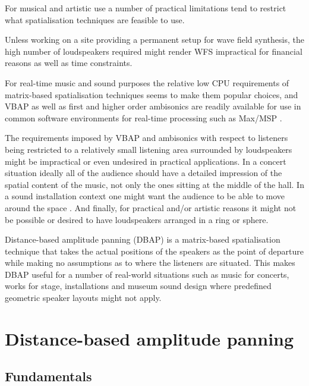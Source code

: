 \documentclass[twoside,10pt]{article}
\begin{document}
For musical and artistic use a number of practical limitations tend to restrict what spatialisation techniques are feasible to use.

Unless working on a site providing a permanent setup for wave field synthesis, the high number of loudspeakers required might render WFS impractical for financial reasons as well as time constraints.

For real-time music and sound purposes the relative low CPU requirements of matrix-based spatialisation techniques seems to make them popular choices, and VBAP as well as first and higher order ambisonics are readily available for use in common software environments for real-time processing such as Max/MSP \cite{Pulkki:2000vbap_max, Schacher:2006ambi_max, Neukom:2008ambipan}.

The requirements imposed by VBAP and ambisonics with respect to listeners being restricted to a relatively small listening area surrounded by loudspeakers might be impractical or even undesired in practical applications. In a concert situation ideally all of the audience should have a detailed impression of the spatial content of the music, not only the ones sitting at the middle of the hall. In a sound installation context one might want the audience to be able to move around the space \cite{lossius:2008installations}. And finally, for practical and/or artistic reasons it might not be possible or desired to have loudspeakers arranged in a ring or sphere.

Distance-based amplitude panning (DBAP) is a matrix-based spatialisation technique that takes the actual positions of the speakers as the point of departure while making no assumptions as to where the listeners are situated. This makes DBAP useful for a number of real-world situations such as music for concerts, works for stage, installations and museum sound design where predefined geometric speaker layouts might not apply.


%
%

\section{Distance-based amplitude panning}

\subsection{Fundamentals}
\end{document}
